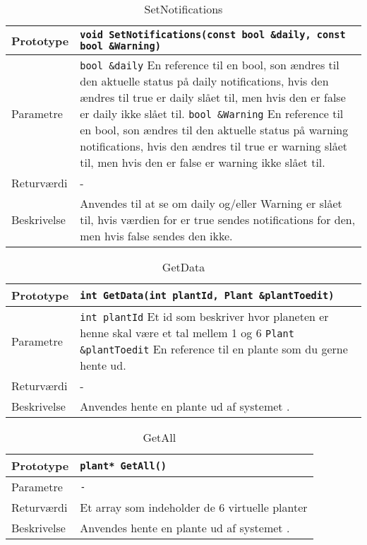 \begin{table}[h]
\begin{tabularx}{\textwidth}{| >{\raggedright\arraybackslash}p{2.5 cm} | >{\raggedright\arraybackslash}X |} \hline
Prototype & \texttt{void SetNotifications(const bool \&daily, const bool \&Warning)} \\\hline
Parametre & \texttt{bool \&daily} \newline En reference til en bool, son ændres til den aktuelle status på daily notifications, hvis den ændres til true er daily slået til, men hvis den er false er daily ikke slået til.
\newline
\texttt{bool \&Warning} \newline En reference til en bool, son ændres til den aktuelle status på warning notifications, hvis den ændres til true er warning slået til, men hvis den er false er warning ikke slået til.
 \\\hline
Returværdi & - \\\hline
Beskrivelse & Anvendes til at se om daily og/eller Warning er slået til, hvis værdien for er true sendes notifications for den, men hvis false sendes den ikke.\\\hline
\end{tabularx}
\caption{SetNotifications}
\label{table:SetNotifications}
\end{table}

\begin{table}[h]
\begin{tabularx}{\textwidth}{| >{\raggedright\arraybackslash}p{2.5 cm} | >{\raggedright\arraybackslash}X |} \hline
Prototype & \texttt{int GetData(int plantId, Plant \&plantToedit)} \\\hline
Parametre & \texttt{int plantId} \newline Et id som beskriver hvor planeten er henne skal være et tal mellem 1 og 6
\newline
\texttt{Plant \&plantToedit} \newline En reference til en plante som du gerne hente ud.
 \\\hline
Returværdi & - \\\hline
Beskrivelse & Anvendes hente en plante ud af systemet .\\\hline
\end{tabularx}
\caption{GetData}
\label{table:GetData}
\end{table}

\begin{table}[h]
\begin{tabularx}{\textwidth}{| >{\raggedright\arraybackslash}p{2.5 cm} | >{\raggedright\arraybackslash}X |} \hline
Prototype & \texttt{plant* GetAll()} \\\hline
Parametre & \texttt{-} \newline

 \\\hline
Returværdi & Et array som indeholder de 6 virtuelle planter \\\hline
Beskrivelse & Anvendes hente en plante ud af systemet .\\\hline
\end{tabularx}
\caption{GetAll}
\label{table:GetAll}
\end{table}

